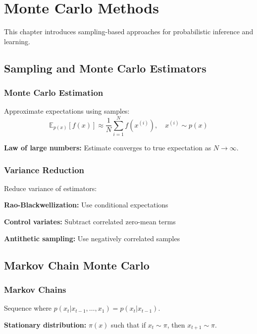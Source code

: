 
\chapter{Monte Carlo Methods}
\label{chap:monte-carlo}

This chapter introduces sampling-based approaches for probabilistic inference and learning.

\section{Sampling and Monte Carlo Estimators}
\label{sec:mc-estimators}

\subsection{Monte Carlo Estimation}

Approximate expectations using samples:
\begin{equation}
\mathbb{E}_{p(x)}[f(x)] \approx \frac{1}{N} \sum_{i=1}^{N} f(x^{(i)}), \quad x^{(i)} \sim p(x)
\end{equation}

\textbf{Law of large numbers:} Estimate converges to true expectation as $N \to \infty$.

\subsection{Variance Reduction}

Reduce variance of estimators:

\textbf{Rao-Blackwellization:} Use conditional expectations

\textbf{Control variates:} Subtract correlated zero-mean terms

\textbf{Antithetic sampling:} Use negatively correlated samples

\section{Markov Chain Monte Carlo}
\label{sec:mcmc}

\subsection{Markov Chains}

Sequence where $p(x_t|x_{t-1}, \ldots, x_1) = p(x_t|x_{t-1})$.

\textbf{Stationary distribution:} $\pi(x)$ such that if $x_t \sim \pi$, then $x_{t+1} \sim \pi$.

